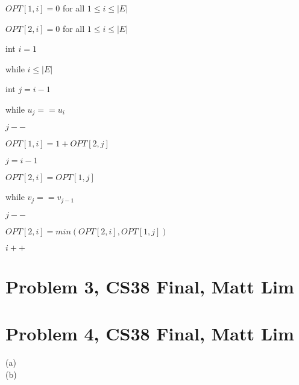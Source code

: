 \documentclass{article}
\begin{document}
\vspace{5mm}
\begin{enumerate}
    \item $OPT[1,i] = 0$ for all $1 \leq i \leq |E|$
    \item $OPT[2,i] = 0$ for all $1 \leq i \leq |E|$
    \item int $i = 1$
    \item while $i \leq |E|$
    {\setlength\itemindent{25pt} \item int $j = i - 1$ }
    {\setlength\itemindent{25pt} \item while $u_j == u_i$ }
    {\setlength\itemindent{50pt} \item $j--$ }
    {\setlength\itemindent{25pt} \item $OPT[1,i] = 1 + OPT[2,j]$ }
    {\setlength\itemindent{25pt} \item $j = i - 1$ }
    {\setlength\itemindent{25pt} \item $OPT[2,i] = OPT[1,j]$ }
    {\setlength\itemindent{25pt} \item while $v_j == v_{j-1} $ }
    {\setlength\itemindent{50pt} \item $j--$ }
    {\setlength\itemindent{50pt} \item $OPT[2,i] = min(OPT[2,i], OPT[1,j])$ }
    {\setlength\itemindent{25pt} \item $i++$ }
\end{enumerate}
\newpage

\section*{Problem 3, CS38 Final, Matt Lim}
\newpage

\section*{Problem 4, CS38 Final, Matt Lim}
\begin{description}
    \item[(a)]
    \item[(b)]
\end{description}
\newpage

\end{document}
